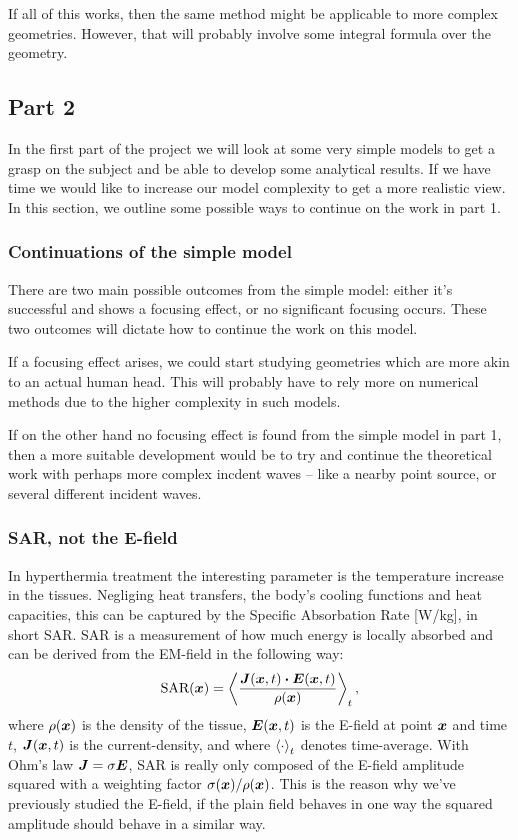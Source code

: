 \documentclass[11pt,a4paper, 
english, swedish %
]{article}
\begin{document}
If all of this works, then the same method might be applicable to more complex geometries. However, that will probably involve some integral formula over the geometry.



\subsection{Part 2}
In the first part of the project we will look at some very simple models to get a grasp on the subject and be able to develop some analytical results. If we have time we would like to increase our model complexity to get a more realistic view. In this section, we outline some possible ways to continue on the work in part 1.


\subsubsection{Continuations of the simple model}
There are two main possible outcomes from the simple model: either it's successful and shows a focusing effect, or no significant focusing occurs. These two outcomes will dictate how to continue the work on this model. 

If a focusing effect arises, we could start studying geometries which are more akin to an actual human head. This will probably have to rely more on numerical methods due to the higher complexity in such models. 

If on the other hand no focusing effect is found from the simple model in part 1, then a more suitable development would be to try and continue the theoretical work with perhaps more complex incdent waves -- like a nearby point source, or several different incident waves.


\subsubsection{SAR, not the E-field}
In hyperthermia treatment the interesting parameter is the temperature increase in the tissues. Negliging heat transfers, the body's cooling functions and heat capacities, this can be captured by the Specific Absorbation Rate [W/kg], in short SAR. SAR is a measurement of how much energy is locally absorbed and can be derived from the EM-field in the following way:
\begin{equation*}
    \text{SAR}(\vb*{x}) =  \ev{\frac{\vb*{J}(\vb*{x}, t) \vdot \vb*{E}(\vb*{x}, t)}{\rho(\vb*{x})}}_t,
\end{equation*}
where $\rho(\vb*{x})$ is the density of the tissue, $\vb*{E}(\vb*{x},t)$ is the E-field at point $\vb*{x}$ and time $t$, $\vb*{J}(\vb*{x},t)$ is the current-density, and where $\ev{\cdot}_t$ denotes time-average. 
With Ohm's law $\vb*J = \sigma \vb*E$, SAR is really only composed of the E-field amplitude squared with a weighting factor $\sigma(\vb*x)/\rho(\vb*x)$. This is the reason why we've previously studied the E-field, if the plain field behaves in one way the squared amplitude should behave in a similar way.
\end{document}
